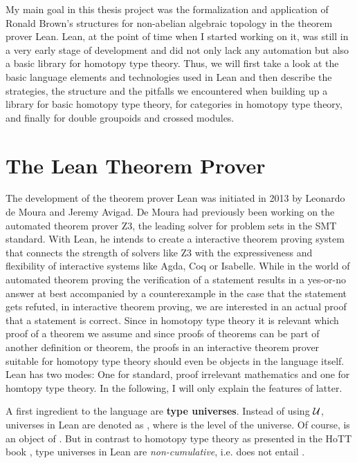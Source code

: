 My main goal in this thesis project was the formalization and application of
Ronald Brown's structures for non-abelian algebraic topology in the theorem prover
Lean.
Lean, at the point of time when I started working on it, was still in a very early
stage of development and did not only lack any automation but also a basic library
for homotopy type theory.
Thus, we will first take a look at the basic language elements and technologies
used in Lean and then describe the strategies, the structure and the pitfalls
we encountered when building up a library for basic homotopy type theory,
for categories in homotopy type theory, and finally for double groupoids and
crossed modules.

\section{The Lean Theorem Prover}

The development of the theorem prover Lean was initiated in 2013 by Leo\-nar\-do
de Moura and Jeremy Avigad.
De Moura had previously been working on the automated theorem prover Z3, the leading
solver for problem sets in the SMT standard.
With Lean, he intends to create a interactive theorem proving system that connects
the strength of solvers like Z3 with the expressiveness and flexibility of
interactive systems like Agda, Coq or Isabelle.
While in the world of automated theorem proving the verification of a statement
results in a yes-or-no answer at best accompanied by a counterexample in the case
that the statement gets refuted, in interactive theorem proving, we are interested
in an actual proof that a statement is correct.
Since in homotopy type theory it is relevant which proof of a theorem we assume
and since proofs of theorems can be part of another definition or theorem,
the proofs in an interactive theorem prover suitable for homotopy type theory
should even be objects in the language itself.
Lean has two modes: One for standard, proof irrelevant mathematics and one for
homtopy type theory.
In the following, I will only explain the features of latter.

A first ingredient to the language are \textbf{type universes}.
Instead of using $\mathcal{U}$, universes in Lean are denoted as , where
 is the level of the universe.
Of course,  is an object of .
But in contrast to homotopy type theory as presented in the HoTT book \cite{hottbook},
type universes in Lean are \emph{non-cumulative}, 
i.e.  does not entail .

